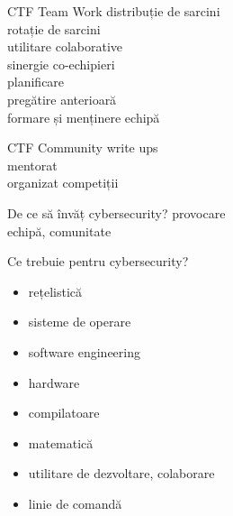 \documentclass{simple}
\begin{document}
\begin{frame}{CTF Team Work}
  \centering
  \pause
  \vspace{0.5cm}
  \Large{distribuție de sarcini} \\
  \pause
  \vspace{0.5cm}
  \Large{rotație de sarcini} \\
  \pause
  \vspace{0.5cm}
  \Large{utilitare colaborative} \\
  \pause
  \vspace{0.5cm}
  \Large{sinergie co-echipieri} \\
  \pause
  \vspace{0.5cm}
  \Large{planificare} \\
  \pause
  \vspace{0.5cm}
  \Large{pregătire anterioară} \\
  \pause
  \vspace{0.5cm}
  \Large{formare și menținere echipă}
\end{frame}

\begin{frame}{CTF Community}
  \centering
  \pause
  \vspace{0.5cm}
  \Large{write ups} \\
  \pause
  \vspace{0.5cm}
  \Large{mentorat} \\
  \pause
  \vspace{0.5cm}
  \Large{organizat competiții}
\end{frame}

\begin{frame}{De ce să învăț cybersecurity?}
  \centering
  \vspace{0.5cm}
  \Large{provocare} \\
  \pause
  \vspace{0.5cm}
  \Large{echipă, comunitate} \\
\end{frame}

\begin{frame}{Ce trebuie pentru cybersecurity?}
  \begin{itemize}
    \pause
    \item rețelistică
    \pause
    \item sisteme de operare
    \pause
    \item software engineering
    \pause
    \item hardware
    \pause
    \item compilatoare
    \pause
    \item matematică
    \pause
    \item utilitare de dezvoltare, colaborare
    \pause
    \item linie de comandă
  \end{itemize}
\end{frame}
\end{document}
